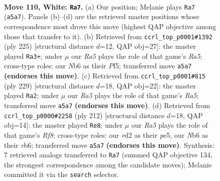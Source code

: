 \documentclass[11pt]{article}
\begin{document}
\clearpage

\begin{figure}[p]\centering
\begin{subfigure}{0.46\textwidth}\centering
\resizebox{\linewidth}{!}{%
\newchessgame
\chessboard[
  setfen={8/6p1/1N3pk1/R6p/7P/6PK/3r4/8 w - - 44 110},
  showmover=false,
  pgfstyle=straightmove, color=movearrow, markmove={a5-a7}
]}
\caption{}
\end{subfigure}\hfill
\begin{subfigure}{0.46\textwidth}\centering
\resizebox{\linewidth}{!}{%
\newchessgame
\chessboard[
  setfen={1R6/6k1/6p1/5p1p/r6P/5KP1/5P2/8 b - - 3 113},
  showmover=false,
  pgfstyle=straightmove, color=movearrow, markmove={a4-a3}
]}
\caption{}
\end{subfigure}
\\[4pt]
\begin{subfigure}{0.46\textwidth}\centering
\resizebox{\linewidth}{!}{%
\newchessgame
\chessboard[
  setfen={8/5pk1/5p2/3R3P/r5P1/5PK1/8/8 b - - 64 115},
  showmover=false,
  pgfstyle=straightmove, color=movearrow, markmove={a4-a2}
]}
\caption{}
\end{subfigure}\hfill
\begin{subfigure}{0.46\textwidth}\centering
\resizebox{\linewidth}{!}{%
\newchessgame
\chessboard[
  setfen={5R2/8/1r4k1/4p1p1/5pP1/5P2/4PK2/8 w - - 16 107},
  showmover=false,
  pgfstyle=straightmove, color=movearrow, markmove={f8-e8}
]}
\caption{}
\end{subfigure}
\caption{\textbf{Move 110, White: \texttt{Ra7}.} (a) Our position; Melanie plays \texttt{Ra7} (\texttt{a5a7}). Panels (b)--(d) are the retrieved master positions whose correspondence most drove this move (highest QAP objective among those that transfer to it). (b) Retrieved from \texttt{ccrl\_top\_p0001\#1392} (ply 225) [structural distance $d$=12, QAP obj=27]: the master played \texttt{Ra3+}; under $\mu$ our \emph{Ra5} plays the role of that game's \emph{Ra5}; cross-type roles: our \emph{N}b6 as their \emph{P}f5; transferred move \texttt{a5a7} \textbf{(endorses this move)}. (c) Retrieved from \texttt{ccrl\_top\_p0001\#815} (ply 229) [structural distance $d$=18, QAP obj=22]: the master played \texttt{Ra2}; under $\mu$ our \emph{Ra5} plays the role of that game's \emph{Ra5}; transferred move \texttt{a5a7} \textbf{(endorses this move)}. (d) Retrieved from \texttt{ccrl\_top\_p0000\#2258} (ply 212) [structural distance $d$=18, QAP obj=14]: the master played \texttt{Re8}; under $\mu$ our \emph{Ra5} plays the role of that game's \emph{Rf8}; cross-type roles: our \emph{r}d2 as their \emph{p}e5, our \emph{N}b6 as their \emph{r}b6; transferred move \texttt{a5a7} \textbf{(endorses this move)}. Synthesis: 7 retrieved analogs transferred to \texttt{Ra7} (summed QAP objective 134, the strongest correspondence among the candidate moves); Melanie committed it via the \texttt{search} selector.}
\label{fig:thought-m218}
\end{figure}
\end{document}
